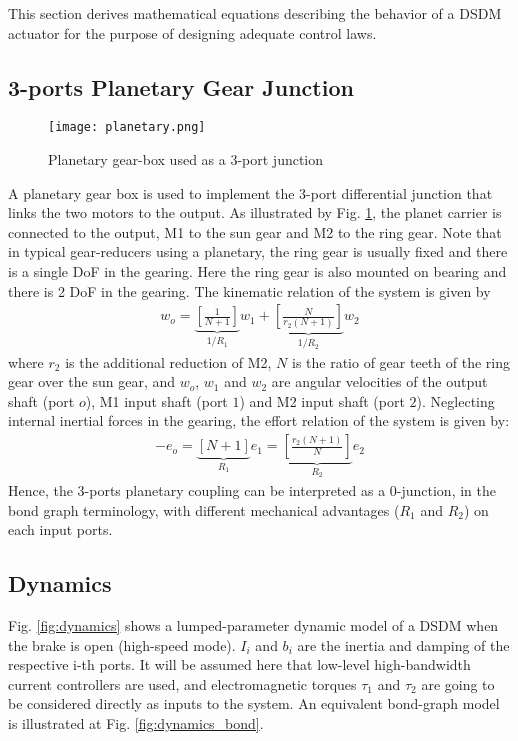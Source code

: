 This section derives mathematical equations describing the behavior of a DSDM actuator for the purpose of designing adequate control laws. 

\subsection{3-ports Planetary Gear Junction}

\begin{figure}[htp]
	\centering
		\texttt{[image: planetary.png]}
	\caption{Planetary gear-box used as a 3-port junction}
	\label{fig:planetary}
\end{figure}

A planetary gear box is used to implement the 3-port differential junction that links the two motors to the output. As illustrated by Fig. \ref{fig:planetary}, the planet carrier is connected to the output, M1 to the sun gear and M2 to the ring gear. Note that in typical gear-reducers using a planetary, the ring gear is usually fixed and there is a single DoF in the gearing. Here the ring gear is also mounted on bearing and there is 2 DoF in the gearing. The kinematic relation of the system is given by
%
\begin{align}
	w_o = 
	\underbrace{ \left[ 
	\frac{ 1 }{N+1}
	\right] }_{  1/R_1  }
	w_1 + 
	\underbrace{ \left[ 
	\frac{ N  }{r_2 (N+1)}
	\right] }_{  1/R_2  }
	w_2
\label{eq:kinematic}
\end{align}
%
where $r_2$ is the additional reduction of M2, $N$ is the ratio of gear teeth of the ring gear over the sun gear, and $w_o$, $w_1$ and $w_2$ are angular velocities of the output shaft (port $o$), M1 input shaft (port $1$) and M2 input shaft (port $2$). Neglecting internal inertial forces in the gearing, the effort relation of the system is given by:
%
\begin{align}
	- e_o =
	\underbrace{ \left[ 
	N+1
	\right] }_{ R_1  }
	e_1 = 
	\underbrace{ \left[ 
	\frac{r_2(N+1)}{N}
	\right] }_{ R_2  }
	e_2
	\label{eq:torque}
\end{align}
%
Hence, the 3-ports planetary coupling can be interpreted as a 0-junction, in the bond graph terminology, with different mechanical advantages ($R_1$ and $R_2$) on each input ports. 

\subsection{Dynamics}
\label{sec:dyn}

Fig. \ref{fig:dynamics} shows a lumped-parameter dynamic model of a DSDM when the brake is open (high-speed mode). $I_i$ and $b_i$ are the inertia and damping of the respective i-th ports. It will be assumed here that low-level high-bandwidth current controllers are used, and electromagnetic torques $\tau_1$ and $\tau_2$ are going to be considered directly as inputs to the system. An equivalent bond-graph model is illustrated at Fig. \ref{fig:dynamics_bond}.

